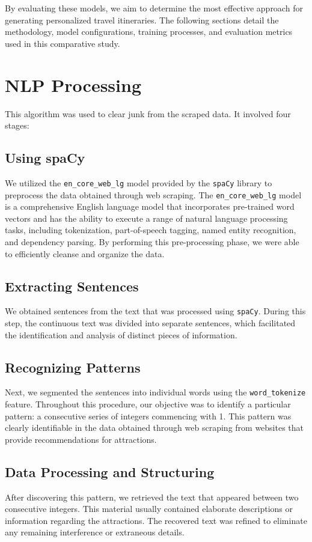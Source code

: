 \documentclass[conference]{IEEEtran}
\begin{document}
    By evaluating these models, we aim to determine the most effective approach for generating personalized travel itineraries. The following sections detail the methodology, model configurations, training processes, and evaluation metrics used in this comparative study.

\section{NLP Processing}

    This algorithm was used to clear junk from the scraped data. It involved four stages:

    \subsection{Using spaCy}
    We utilized the \texttt{en\_core\_web\_lg} model provided by the \texttt{spaCy} library to preprocess the data obtained through web scraping. The \texttt{en\_core\_web\_lg} model is a comprehensive English language model that incorporates pre-trained word vectors and has the ability to execute a range of natural language processing tasks, including tokenization, part-of-speech tagging, named entity recognition, and dependency parsing. By performing this pre-processing phase, we were able to efficiently cleanse and organize the data.

    \subsection{Extracting Sentences}
    We obtained sentences from the text that was processed using \texttt{spaCy}. During this step, the continuous text was divided into separate sentences, which facilitated the identification and analysis of distinct pieces of information.

    \subsection{Recognizing Patterns}
    Next, we segmented the sentences into individual words using the \texttt{word\_tokenize} feature. Throughout this procedure, our objective was to identify a particular pattern: a consecutive series of integers commencing with 1. This pattern was clearly identifiable in the data obtained through web scraping from websites that provide recommendations for attractions.

    \subsection{Data Processing and Structuring}
    After discovering this pattern, we retrieved the text that appeared between two consecutive integers. This material usually contained elaborate descriptions or information regarding the attractions. The recovered text was refined to eliminate any remaining interference or extraneous details.
\end{document}
